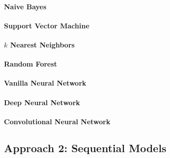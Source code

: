 \paragraph{Naive Bayes}
\label{par:Naive Bayes}

\paragraph{Support Vector Machine}
\label{par:Support Vector Machine}

\paragraph{$k$ Nearest Neighbors}
\label{par:k Nearest Neighbors}

\paragraph{Random Forest}
\label{par:Random Forest}

\paragraph{Vanilla Neural Network}
\label{par:Vanilla Neural Network}

\paragraph{Deep Neural Network}
\label{par:Deep Neural Network}

\paragraph{Convolutional Neural Network}
\label{par:Convolutional Neural Network}


\subsection{Approach 2: Sequential Models}
\label{sub:Approach 2: Sequential Models (Experiments)}

